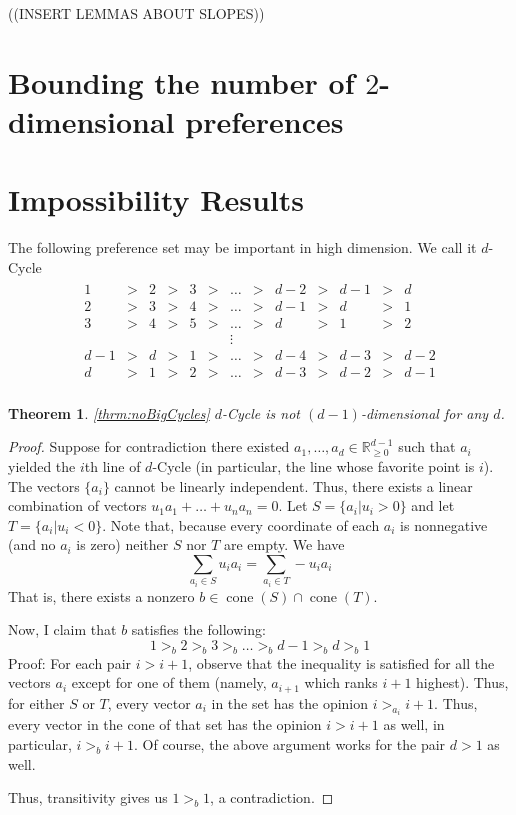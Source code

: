 \documentclass[12pt]{article}
\newtheorem{theorem}{Theorem}
\newcommand{\Rgz}{\mathbb{R}_{\ge 0}}
\DeclareMathOperator*{\cone}{cone}
\newcommand{\1}[1]{\mathds{1}[{#1}]}
\begin{document}
    ((INSERT LEMMAS ABOUT SLOPES))

\section{Bounding the number of $2$-dimensional preferences}

\section{Impossibility Results}

  The following preference set may be important in high dimension.
  We call it $d$-{\sc Cycle}
  \begin{align*}
    \begin{array}{ccccccccccccccccccccccccccccccccccccccccc}
    1 &>& 2 &>& 3 &>&\ldots &>& d-2 &>& d-1 &>& d \\
    2 &>& 3 &>& 4 &>& \ldots &>& d-1 &>& d &>& 1 \\
    3 &>& 4 &>& 5 &>& \ldots &>& d &>& 1 &>& 2 \\
      &&    &&    &&   \vdots \\
    d-1&>&d&>& 1 &>&\ldots &>& d-4 &>& d-3 &>& d-2\\
    d &>& 1 &>& 2 &>& \ldots &>& d-3 &>& d-2 &>& d-1 \\
    \end{array}
  \end{align*}
  \begin{theorem}\ref{thrm:noBigCycles}
    $d$-{\sc Cycle} is not $(d-1)$-dimensional for any $d$.
  \end{theorem}
  \begin{proof}
    Suppose for contradiction there existed
    $a_1,\ldots,a_d\in\Rgz^{d-1}$ such that $a_i$ yielded the $i$th line of
    $d$-{\sc Cycle} (in particular, the line whose favorite point is $i$).
    The vectors $\{a_i\}$ cannot be linearly independent.
    Thus, there exists a linear combination of vectors
    $u_1 a_1 + \ldots + u_n a_n = 0$.
    Let $S = \{a_i | u_i > 0\}$ and let $T = \{a_i | u_i < 0\}$.
    Note that, because every coordinate of each $a_i$ is nonnegative
    (and no $a_i$ is zero) neither $S$ nor $T$ are empty.
    We have
    \[ \sum_{a_i \in S} u_i a_i = \sum_{a_i \in T} -u_i a_i \]
    That is, there exists a nonzero $b\in \cone(S) \cap \cone(T)$.

    Now, I claim that $b$ satisfies the following:
    \[ 1 >_b 2 >_b 3 >_b \ldots >_b d-1 >_b d >_b 1 \]
    Proof: For each pair $i > i+1$,
    observe that the inequality is satisfied for all the vectors $a_i$ except
    for one of them (namely, $a_{i+1}$ which ranks $i+1$ highest).
    Thus, for either $S$ or $T$, every vector $a_i$ in the set has the opinion
    $i >_{a_i} i+1$. Thus, every vector in the cone of that set
    has the opinion $i > i+1$ as well, in particular, $i >_b i+1$.
    Of course, the above argument works for the pair $d>1$ as well.

    Thus, transitivity gives us $1>_b 1$, a contradiction.
  \end{proof}
\end{document}
